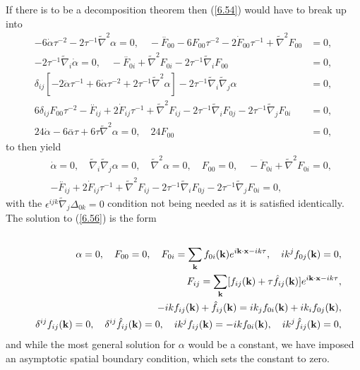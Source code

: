 If there is to be a decomposition theorem then (\ref{6.54}) would have to break up into 
%
\begin{align}
-6 \dot{\alpha} \tau^{-2} - 2 \tau^{-1} \tilde{\nabla}^2\alpha=0, \quad - \overset{..}{F}_{00}  - 6 F_{00} \tau^{-2} - 2 \dot{F}_{00} \tau^{-1} + \tilde{\nabla}^2F_{00}&=0,
\nonumber\\ 
-2 \tau^{-1} \tilde{\nabla}_{i}\dot{\alpha}=0,\quad - \overset{..}{F}_{0i} +  \tilde{\nabla}^2F_{0i} - 2 \tau^{-1} \tilde{\nabla}_{i}F_{00}&=0,
\nonumber\\ 
\delta_{ij} \left[- 2 \ddot{\alpha}\tau^{-1}+  6 \dot{\alpha} \tau^{-2}  + 2\tau^{-1} \tilde{\nabla}^2\alpha \right]-2\tau^{-1} \tilde{\nabla}_{i}\tilde{\nabla}_{j}\alpha&=0,
\nonumber\\
6 \delta_{ij}F_{00} \tau^{-2} - \overset{..}{F}_{ij}  + 2 \dot{F}_{ij} \tau^{-1} + \tilde{\nabla}^2F_{ij} - 2 \tau^{-1} \tilde{\nabla}_{i}F_{0j} - 2 \tau^{-1} \tilde{\nabla}_{j}F_{0i}&=0,
\nonumber\\
24\dot{\alpha} - 6  \overset{..}{\alpha} \tau + 6  \tau \tilde{\nabla}^2\alpha=0,\quad 24 F_{00}&=0,
\label{6.55}
\end{align}
%
to then yield
%
\begin{eqnarray}
&& \dot{\alpha}=0,\quad \tilde{\nabla}_{i}\tilde{\nabla}_{j}\alpha=0,\quad \tilde{\nabla}^2\alpha=0,\quad F_{00}=0,\quad  - \ddot{F}_{0i} +  \tilde{\nabla}^2F_{0i} =0,
\nonumber\\ 
&&  - \overset{..}{F}_{ij}  + 2 \dot{F}_{ij} \tau^{-1} + \tilde{\nabla}^2F_{ij} - 2 \tau^{-1} \tilde{\nabla}_{i}F_{0j} - 2 \tau^{-1} \tilde{\nabla}_{j}F_{0i}=0,
\label{6.56}
\end{eqnarray}
%
with the $\epsilon^{ijk}\tilde{\nabla}_j\Delta_{0k}=0$ condition not being needed as it is satisfied identically. The solution to (\ref{6.56}) is the form 
%
\begin{eqnarray}
\nonumber\\ 
&& \alpha=0,\quad F_{00}=0,\quad F_{0i}=\sum _{\bf k}f_{0i}({\bf k})e^{i{\bf k}\cdot {\bf x}-ik\tau},\quad  ik^jf_{0j}({\bf k})=0,
\nonumber\\
&& F_{ij}=\sum _{\bf k}[f_{ij}({\bf k})+\tau\hat{f}_{ij}({\bf k})]e^{i{\bf k}\cdot {\bf x}-ik\tau},
\nonumber\\
&&-ikf_{ij}({\bf k})+\hat{f}_{ij}({\bf k})=ik_jf_{0i}({\bf k})+ik_if_{0j}({\bf k}),
\\
&&\delta^{ij}f_{ij}({\bf k})=0,\quad
\delta^{ij}\hat{f}_{ij}({\bf k})=0,\quad ik^jf_{ij}({\bf k})=-ikf_{0i}({\bf k}),\quad ik^j\hat{f}_{ij}({\bf k})=0,
\nonumber
\label{6.57}
\end{eqnarray}
%
and while the most general solution for  $\alpha$ would be  a constant,  we have imposed an asymptotic spatial boundary condition, which sets the constant to zero.



